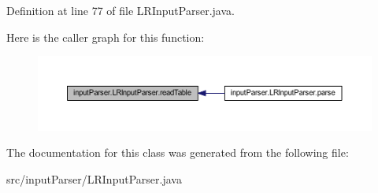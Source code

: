 Definition at line 77 of file L\-R\-Input\-Parser.\-java.



Here is the caller graph for this function\-:
\nopagebreak
\begin{figure}[H]
\begin{center}
\leavevmode
\includegraphics[width=350pt]{classinput_parser_1_1_l_r_input_parser_a1ade16089652dc354434e1ddb1769e96_icgraph}
\end{center}
\end{figure}




The documentation for this class was generated from the following file\-:\begin{DoxyCompactItemize}
\item 
src/input\-Parser/L\-R\-Input\-Parser.\-java\end{DoxyCompactItemize}
